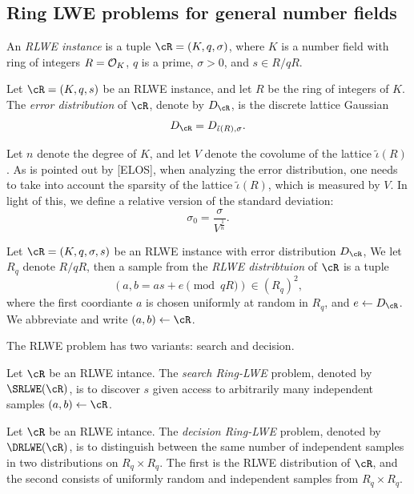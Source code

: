 \documentclass{amsart}
\begin{document}
\subsection{Ring LWE problems for general number fields}

\begin{Definition}
An {\it RLWE instance} is a tuple $\cR = (K,q,\sigma)$, where $K$ is a number field with ring of integers $R = \mathcal{O}_K$, $q$ is a prime, $\sigma >0$, and $s \in R/qR$.
\end{Definition}


\begin{Definition}
Let $\cR = (K,q,s)$ be an RLWE instance, and let $R$ be the ring of integers of $K$. The {\it error distribution} of $\cR$, denote by $D_\cR$, is the discrete lattice Gaussian
\[
D_\cR = D_{\tilde{\iota}(R),\sigma}.
\]
\end{Definition}

Let $n$ denote the degree of $K$, and let $V$ denote the covolume of the lattice $\tilde{\iota}(R)$. As is pointed out by [ELOS], when analyzing the error distribution, one needs to take into account the sparsity of the lattice $\tilde{\iota}(R)$, which is measured by $V$. In light of this, we define a relative version of the standard deviation: $$\sigma_0 = \frac{\sigma}{V^{\frac{1}{n}}}.$$

\begin{Definition}
Let $\cR = (K,q,\sigma, s)$ be an RLWE instance with error distribution $D_\cR$, We let $R_q$ denote $R/qR$, then
a sample from the {\it RLWE distribtuion} of $\cR$ is a tuple
$$(a, b = as+e\pmod{qR}) \in (R_q)^2, $$
where the first coordiante $a$ is chosen uniformly at random in $R_q$, and $e \gets D_\cR$. We abbreviate and write $(a,b) \gets \cR$.
\end{Definition}

The RLWE problem has two variants: search and decision.

\begin{Definition}[Search]
Let $\cR$ be an RLWE intance. The {\it search Ring-LWE} problem, denoted by $\SRLWE(\cR)$, is to discover $s$ given access to arbitrarily many independent samples $(a,b) \gets \cR$.
\end{Definition}

\begin{Definition}[Decision]
Let $\cR$ be an RLWE intance. The {\it decision Ring-LWE}
problem, denoted by $\DRLWE(\cR)$, is to distinguish between the same number of independent samples in two distributions on $R_q \times R_q$. The first is the RLWE distribution of $\cR$, and the second consists of uniformly random and independent samples from $R_q \times R_q$.
\end{Definition}
\end{document}
